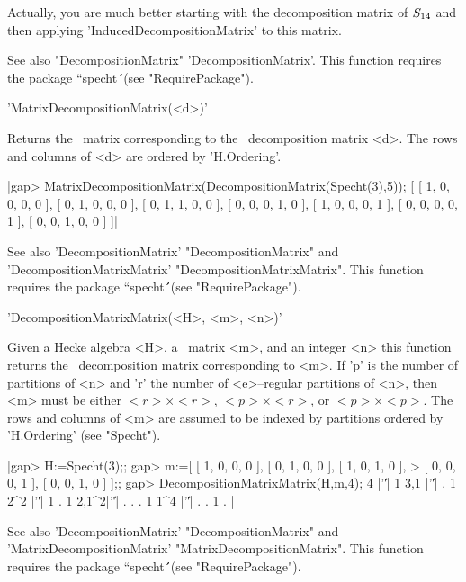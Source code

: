 Actually, you are much better starting with the decomposition matrix of
$S_{14}$ and then applying 'InducedDecompositionMatrix' to this matrix.

See also "DecompositionMatrix" 'DecompositionMatrix'. This function
requires the package ``specht\'\'\ (see "RequirePackage").



'MatrixDecompositionMatrix(<d>)'

Returns the \GAP\ matrix corresponding to the \Specht\ decomposition
matrix <d>. The rows and columns of <d> are ordered by 'H.Ordering'.

|gap> MatrixDecompositionMatrix(DecompositionMatrix(Specht(3),5));      
[ [ 1, 0, 0, 0, 0 ], [ 0, 1, 0, 0, 0 ], [ 0, 1, 1, 0, 0 ], 
  [ 0, 0, 0, 1, 0 ], [ 1, 0, 0, 0, 1 ], [ 0, 0, 0, 0, 1 ], 
  [ 0, 0, 1, 0, 0 ] ]|

See also 'DecompositionMatrix' "DecompositionMatrix" and
'DecompositionMatrixMatrix' "DecompositionMatrixMatrix". This function
requires the package ``specht\'\'\ (see "RequirePackage").



'DecompositionMatrixMatrix(<H>, <m>, <n>)'

Given a Hecke algebra <H>, a \GAP\ matrix <m>, and an integer <n> this
function returns the \Specht\ decomposition matrix corresponding to <m>.
If 'p' is the number of partitions of <n> and 'r' the number of
<e>--regular partitions of <n>, then <m> must be either $<r>\times<r>$,
$<p>\times<r>$, or $<p>\times<p>$. The rows and columns of <m> are assumed
to be indexed by partitions ordered by 'H.Ordering' (see "Specht").

|gap> H:=Specht(3);;
gap> m:=[ [ 1, 0, 0, 0 ], [ 0, 1, 0, 0 ], [ 1, 0, 1, 0 ], 
>         [ 0, 0, 0, 1 ], [ 0, 0, 1, 0 ] ];;
gap> DecompositionMatrixMatrix(H,m,4);
4    |'\|'| 1       
3,1  |'\|'| . 1     
2^2  |'\|'| 1 . 1   
2,1^2|'\|'| . . . 1
1^4  |'\|'| . . 1 . |

See also 'DecompositionMatrix' "DecompositionMatrix" and
'MatrixDecompositionMatrix' "MatrixDecompositionMatrix". This function
requires the package ``specht\'\'\ (see "RequirePackage").


